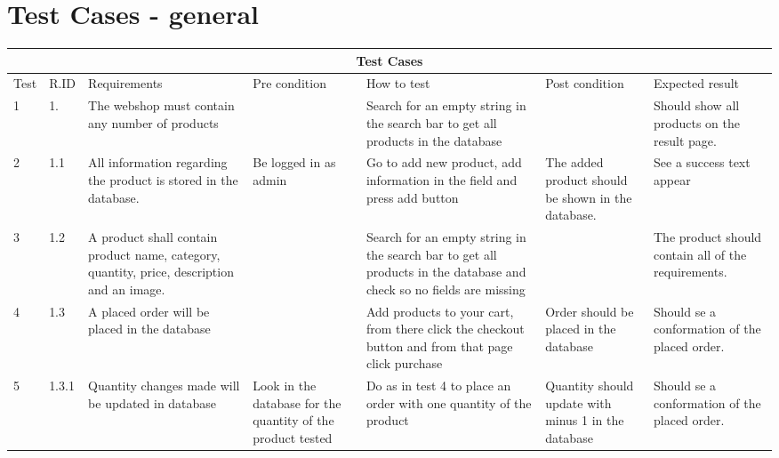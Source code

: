 \documentclass[a4paper,12pt]{article}
\begin{document}
\section{Test Cases - general}

\begin{tabular}{ |p{0.8cm}|p{0.8cm}|p{2.8cm}|p{2.8cm}|p{2.8cm}|p{2.8cm}|p{2.8cm}|}

	\hline
	\multicolumn{7}{|c|}{Test Cases} \\
	\hline
	Test& R.ID & Requirements &Pre condition &How to test& Post condition &Expected result\\
	\hline
	1 & 1. &The webshop must contain any number of products &  & Search for an empty string in the search bar to get all products in the database & &Should show all products on the result page.\\
	\hline
	2  & 1.1 & All information regarding the product is stored in the database. & Be logged in as admin & Go to add new product, add information in the field and press add button & The added product should be shown in the database. & See a success text appear\\
	\hline
	3 & 1.2  &A product shall contain product name, category, quantity, price, description and an image.&    &Search for an empty string in the search bar to get all products in the database and check so no fields are missing & &The product should contain all of the requirements.\\
	\hline
	4 & 1.3 &A placed order will be placed in the database&  & Add products to your cart, from there click the checkout button and from that page click purchase& Order should be placed in the database & Should se a conformation of the placed order.  \\
	\hline
	5 & 1.3.1 &Quantity changes made will be updated in database&  Look in the database for the quantity of the product tested & Do as in test 4 to place an order with one quantity of the product & Quantity should update with minus 1 in the database & Should se a conformation of the placed order.\\
	\hline
\end{tabular}
\end{document}
